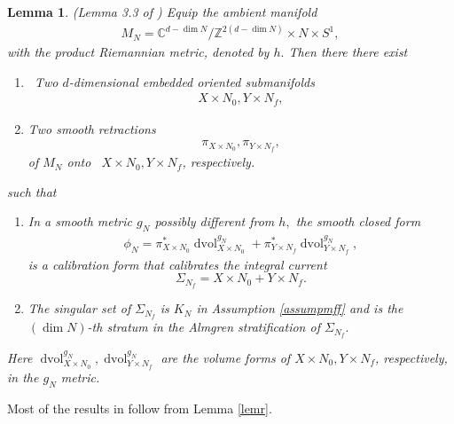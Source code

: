 \documentclass[11pt,a4paper]{amsart}
\numberwithin{equation}{section}
\newcommand{\xn}{X\times N_0}
\newcommand{\yn}{Y\times N_f}
\newcommand{\mff}{\mathcal{F}}
\newcommand{\Si}{\Sigma}
\newcommand{\cd}{\cdots}
\newcommand{\dvol}{\operatorname{dvol}}
\newcommand{\du}{^\ast}
\newcommand{\pxn}{\pi_{X\times N_0}}
\newcommand{\pyn}{\pi_{Y\times N_f}}
\newcommand{\dvx}{\dvol_{X\times N_0}^{g_N}}
\newcommand{\dvy}{\dvol_{Y\times N_f}^{g_N}}
\newcommand{\Z}{\mathbb{Z}}
\newcommand{\C}{\mathbb{C}}
\theoremstyle{plain}
\newtheorem{lem}[exam]{Lemma}
\theoremstyle{definition}
\numberwithin{equation}{subsection}
\begin{document}
	\begin{lem}\label{lemzla}(Lemma 3.3 of \cite{ZLa})
		\label{lemr}%
		Equip the ambient manifold
		\begin{align}\label{defnmn}
			M_N=\C^{d-\dim N}/\Z^{2(d-\dim N)}\times N\times S^1,
		\end{align}with the product Riemannian metric, denoted by $h.$ Then there there exist
		\begin{enumerate}
			\item  Two $d$-dimensional embedded oriented submanifolds 
			\begin{align*}
				X\times N_0, Y\times N_f,
			\end{align*} 
			\item Two smooth retractions 
			\begin{align*}
				\pi_{X\times N_0},\pi_{Y\times N_f},
			\end{align*}of $M_N$ 
			onto  $X\times N_0, Y\times N_f$, respectively.
		\end{enumerate}
		such that
		\begin{enumerate}
			\item In a smooth metric $g_N$ possibly different from $h,$ the smooth closed form
			\begin{align}\label{eqpn1}
				\phi_N=\pxn\du\dvx+\pyn\du\dvy,
			\end{align}is a calibration form that calibrates the integral current $$\Si_{N_f}=X\times N_0+Y\times N_f.$$
			\item The singular set of $\Si_{N_f}$ is $K_N$ in Assumption \ref{assumpmff} and is the $(\dim N)$-th stratum in the Almgren stratification of $\Si_{N_f}.$
		\end{enumerate}%
		Here $\dvx,\dvy$ are the volume forms of $\xn,\yn$, respectively, in the $g_N$ metric.
	\end{lem}
	Most of the results in \cite{ZLa} follow from Lemma \ref{lemr}. 
\end{document}
